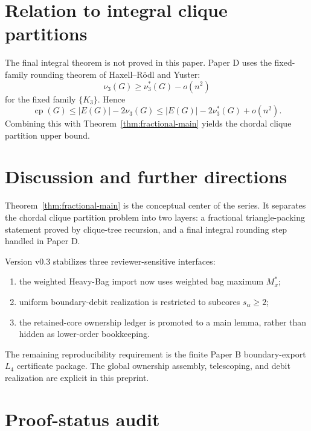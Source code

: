 \documentclass[11pt]{article}
\theoremstyle{definition}
\newcommand{\cp}{\operatorname{cp}}
\begin{document}
\section{Relation to integral clique partitions}

The final integral theorem is not proved in this paper. Paper D uses the fixed-family rounding theorem of Haxell--R\"odl and Yuster:
\[
    \nu_3(G)
    \ge
    \nu_3^*(G)-o(n^2)
\]
for the fixed family \(\{K_3\}\). Hence
\[
    \cp(G)
    \le
    |E(G)|-2\nu_3(G)
    \le
    |E(G)|-2\nu_3^*(G)+o(n^2).
\]
Combining this with Theorem~\ref{thm:fractional-main} yields the chordal clique partition upper bound.

\section{Discussion and further directions}

Theorem~\ref{thm:fractional-main} is the conceptual center of the series. It separates the chordal clique partition problem into two layers: a fractional triangle-packing statement proved by clique-tree recursion, and a final integral rounding step handled in Paper D.

Version v0.3 stabilizes three reviewer-sensitive interfaces:
\begin{enumerate}[label=(\roman*)]
    \item the weighted Heavy-Bag import now uses weighted bag maximum \(M_x^*\);
    \item uniform boundary-debit realization is restricted to subcores \(s_\alpha\ge2\);
    \item the retained-core ownership ledger is promoted to a main lemma, rather than hidden as lower-order bookkeeping.
\end{enumerate}

The remaining reproducibility requirement is the finite Paper B boundary-export \(L_4\) certificate package. The global ownership assembly, telescoping, and debit realization are explicit in this preprint.

\section{Proof-status audit}
\end{document}
